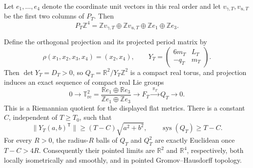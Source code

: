 Let $e_1,\ldots,e_4$ denote the coordinate unit vectors in this real
order and let $v_{\gamma,T},v_{u,T}$ be the first two columns of $P_T$.
Then
\[
 P_T\mathbb Z^4=
 \mathbb Zv_{\gamma,T}\oplus\mathbb Zv_{u,T}
                 \oplus\mathbb Ze_1\oplus\mathbb Ze_3.
\]

\begin{proposition}
\label{wb:cusp-spec-native-quotient}
Define the orthogonal projection and its projected period matrix by
\[
 \rho(x_1,x_2,x_3,x_4)=(x_2,x_4),\qquad
 Y_T=\begin{pmatrix}6m_T&L_T\\-q_T&m_T\end{pmatrix}.
\]
Then $\det Y_T=D_T>0$, so $Q_T=\mathbb R^2/Y_T\mathbb Z^2$ is a
compact real torus, and projection induces an exact sequence of compact
real Lie groups
\[
 0\longrightarrow
 \mathbb T^2_{\mathrm{re}}=
 \frac{\mathbb Re_1\oplus\mathbb Re_3}
      {\mathbb Ze_1\oplus\mathbb Ze_3}
 \longrightarrow F_T\xrightarrow{\ \pi_T\ }Q_T
 \longrightarrow0.
\]
This is a Riemannian quotient for the displayed flat metrics.  There is a
constant $C$, independent of $T\geq T_0$, such that
\[
 \|Y_T(a,b)^{\mathsf T}\|\geq(T-C)\sqrt{a^2+b^2},\qquad
 \operatorname{sys}(Q_T)\geq T-C.
\]
For every $R>0$, the radius-$R$ balls of $Q_T$ and $Q_T^2$ are exactly
Euclidean once $T-C>4R$.  Consequently their pointed limits are
$\mathbb R^2$ and $\mathbb R^4$, respectively, both locally isometrically
and smoothly, and in pointed Gromov--Hausdorff topology.
\end{proposition}

